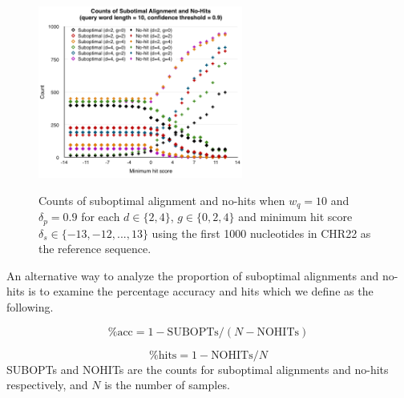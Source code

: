 \documentclass{article}
\begin{document}
\begin{figure}[tbp]
\begin{center}
\caption{Counts of suboptimal alignment and no-hits when $w_q = 10$ and $\delta_p=0.9$ for each $d \in \{2, 4\}$, $g \in \{0, 2, 4\}$ and  minimum hit score $\delta_s \in \{-13, -12, ... , 13\}$ using the first 1000 nucleotides in CHR22 as the reference sequence.}
  \includegraphics[width=0.60\textwidth]{counts-10}
  \label{figure:counts_10}
\end{center}
\end{figure}

An alternative way to analyze the proportion of suboptimal alignments and no-hits is to examine the percentage accuracy and hits which we define as the following.

\begin{equation}
\%\mbox{acc} = 1 - \mbox{SUBOPTs}/(N - \mbox{NOHITs})
\end{equation}

\begin{equation}
\%\mbox{hits} = 1 - \mbox{NOHITs}/N
\end{equation}
SUBOPTs and NOHITs are the counts for suboptimal alignments and no-hits respectively, and $N$ is the number of samples. 
\end{document}

